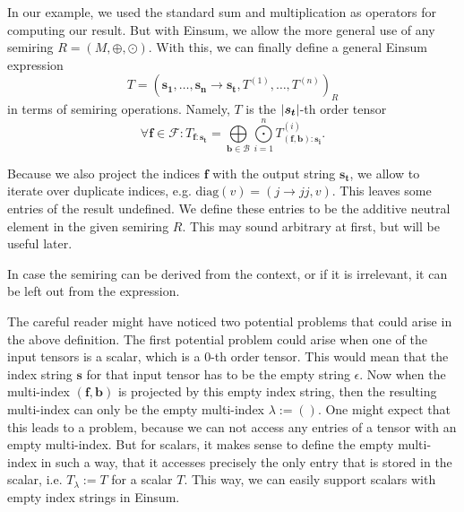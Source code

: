 \begin{definition}
    In our example, we used the standard sum and multiplication as operators for computing our result.
    But with Einsum, we allow the more general use of any semiring $R = (M, \oplus, \odot)$.
    With this, we can finally define a general Einsum expression
    $$T = (\bm{s_1},\dots,\bm{s_n} \rightarrow \bm{s_t}, T^{(1)},\dots,T^{(n)})_R$$
    in terms of semiring operations. Namely, $T$ is the $\left\lvert \bm{s_t} \right\rvert$-th order tensor
    $$\forall \bm{f} \in \mathcal{F}: T_{\bm{f}: \bm{s_t}} = \bigoplus\limits_{\bm{b} \in \mathcal{B}} \bigodot\limits_{i = 1}^{n} T^{(i)}_{(\bm{f},\bm{b}):\bm{s_i}}.$$

    Because we also project the indices $\bm{f}$ with the output string $\bm{s_t}$, we allow to iterate over duplicate indices,
    e.g. $\text{diag}(v) = (j \rightarrow jj, v)$.
    This leaves some entries of the result undefined.
    We define these entries to be the additive neutral element in the given semiring $R$.
    This may sound arbitrary at first, but will be useful later.

    In case the semiring can be derived from the context, or if it is irrelevant, it can be left out from the expression.


\end{definition}
\bigskip

The careful reader might have noticed two potential problems that could arise in the above definition.
The first potential problem could arise when one of the input tensors is a scalar, which is a 0-th order tensor.
This would mean that the index string $\bm{s}$ for that input tensor has to be the empty string $\epsilon$.
Now when the multi-index $(\bm{f}, \bm{b})$ is projected by this empty index string, then the resulting multi-index can only be the empty multi-index $\lambda := ()$.
One might expect that this leads to a problem, because we can not access any entries of a tensor with an empty multi-index.
But for scalars, it makes sense to define the empty multi-index in such a way, that it accesses precisely the only entry that is stored in the scalar, i.e. $T_\lambda := T$ for a scalar $T$.
This way, we can easily support scalars with empty index strings in Einsum.

